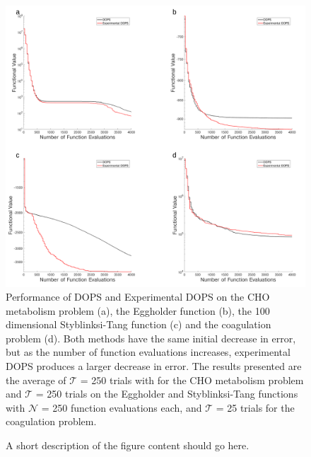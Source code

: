 \documentclass{bmcart}
\begin{document}
\begin{backmatter}
\begin{figure}[h!]
\includegraphics[width = 1.0\textwidth]{./rachelfigs/expDOPSvsDOPS-crop.pdf}
\caption{ Performance of DOPS and Experimental DOPS on the CHO metabolism problem (a), the Eggholder function (b), the 100 dimensional Styblinksi-Tang function (c) and the coagulation problem (d). Both methods have the same initial decrease in error, but as the number of function evaluations increases, experimental DOPS produces a larger decrease in error.
The results presented are the average of $\mathcal{T}$ = 250 trials with for the CHO metabolism problem and $\mathcal{T}$ = 250 trials on the Eggholder and Styblinksi-Tang functions with $\mathcal{N}$ = 250 function evaluations each, and $\mathcal{T}$ = 25 trials for the coagulation problem.
}\label{fig-exp-DOPS-b4}
\end{figure}


  \begin{figure}[h!]
  \caption{
      A short description of the figure content
      should go here.}
      \end{figure}



\end{backmatter}
\end{document}
